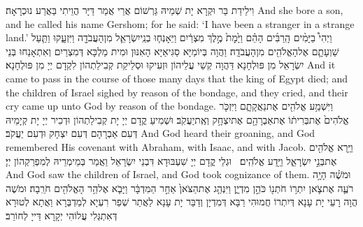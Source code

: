 {וִילֵידַת בַּר וּקְרָא יָת שְׁמֵיהּ גֵּרְשׁוֹם אֲרֵי אֲמַר דַּיָּר הֲוֵיתִי בַּאֲרַע נוּכְרָאָה׃}
{And she bore a son, and he called his name Gershom; for he said: ‘I have been a stranger in a strange land.’}{}
{וַיְהִי֩ בַיָּמִ֨ים הָֽרַבִּ֜ים הָהֵ֗ם וַיָּ֙מׇת֙ מֶ֣לֶךְ מִצְרַ֔יִם וַיֵּאָנְח֧וּ בְנֵֽי\maqqaf יִשְׂרָאֵ֛ל מִן\maqqaf הָעֲבֹדָ֖ה וַיִּזְעָ֑קוּ וַתַּ֧עַל שַׁוְעָתָ֛ם אֶל\maqqaf הָאֱלֹהִ֖ים מִן\maqqaf הָעֲבֹדָֽה׃}
{וַהֲוָה בְּיוֹמַיָּא סַגִּיאַיָּא הָאִנּוּן וּמִית מַלְכָּא דְּמִצְרַיִם וְאִתְאָנַחוּ בְּנֵי יִשְׂרָאֵל מִן פּוּלְחָנָא דַּהֲוָה קְשֵׁי עֲלֵיהוֹן וּזְעִיקוּ וּסְלֵיקַת קְבִילַתְהוֹן לִקְדָם יְיָ מִן פּוּלְחָנָא׃}
{And it came to pass in the course of those many days that the king of Egypt died; and the children of Israel sighed by reason of the bondage, and they cried, and their cry came up unto God by reason of the bondage.}{}
{וַיִּשְׁמַ֥ע אֱלֹהִ֖ים אֶת\maqqaf נַאֲקָתָ֑ם וַיִּזְכֹּ֤ר אֱלֹהִים֙ אֶת\maqqaf בְּרִית֔וֹ אֶת\maqqaf אַבְרָהָ֖ם אֶת\maqqaf יִצְחָ֥ק וְאֶֽת\maqqaf יַעֲקֹֽב׃}
{וּשְׁמִיעַ קֳדָם יְיָ יָת קְבִילַתְהוֹן וּדְכִיר יְיָ יָת קְיָמֵיהּ דְּעִם אַבְרָהָם דְּעִם יִצְחָק וּדְעִם יַעֲקֹב׃}
{And God heard their groaning, and God remembered His covenant with Abraham, with Isaac, and with Jacob.}{}
{וַיַּ֥רְא אֱלֹהִ֖ים אֶת\maqqaf בְּנֵ֣י יִשְׂרָאֵ֑ל וַיֵּ֖דַע אֱלֹהִֽים׃ \setuma }
{וּגְלֵי קֳדָם יְיָ שִׁעְבּוּדָא דִּבְנֵי יִשְׂרָאֵל וַאֲמַר בְּמֵימְרֵיהּ לְמִפְרַקְהוֹן יְיָ׃}
{And God saw the children of Israel, and God took cognizance of them.}{}
\newperek
{}
{וּמֹשֶׁ֗ה הָיָ֥ה רֹעֶ֛ה אֶת\maqqaf צֹ֛אן יִתְר֥וֹ חֹתְנ֖וֹ כֹּהֵ֣ן מִדְיָ֑ן וַיִּנְהַ֤ג אֶת\maqqaf הַצֹּאן֙ אַחַ֣ר הַמִּדְבָּ֔ר וַיָּבֹ֛א אֶל\maqqaf הַ֥ר הָאֱלֹהִ֖ים חֹרֵֽבָה׃}
{וּמֹשֶׁה הֲוָה רָעֵי יָת עָנָא דְּיִתְרוֹ חֲמוּהִי רַבָּא דְּמִדְיָן וְדַבַּר יָת עָנָא לַאֲתַר שְׁפַר רִעְיָא לְמַדְבְּרָא וַאֲתָא לְטוּרָא דְּאִתְגְּלִי עֲלוֹהִי יְקָרָא דַּייָ לְחוֹרֵב׃}

